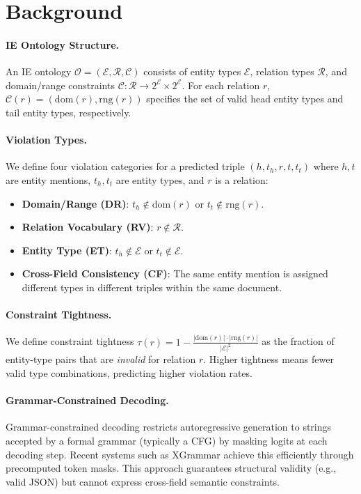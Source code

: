 \documentclass[11pt,a4paper]{article}
\begin{document}
\section{Background}
\label{sec:background}

\paragraph{IE Ontology Structure.}
An IE ontology $\mathcal{O} = (\mathcal{E}, \mathcal{R}, \mathcal{C})$ consists of entity types $\mathcal{E}$, relation types $\mathcal{R}$, and domain/range constraints $\mathcal{C}: \mathcal{R} \to 2^{\mathcal{E}} \times 2^{\mathcal{E}}$. For each relation $r$, $\mathcal{C}(r) = (\text{dom}(r), \text{rng}(r))$ specifies the set of valid head entity types and tail entity types, respectively.

\paragraph{Violation Types.}
We define four violation categories for a predicted triple $(h, t_h, r, t, t_t)$ where $h, t$ are entity mentions, $t_h, t_t$ are entity types, and $r$ is a relation:
\begin{itemize}
    \item \textbf{Domain/Range (DR)}: $t_h \notin \text{dom}(r)$ or $t_t \notin \text{rng}(r)$.
    \item \textbf{Relation Vocabulary (RV)}: $r \notin \mathcal{R}$.
    \item \textbf{Entity Type (ET)}: $t_h \notin \mathcal{E}$ or $t_t \notin \mathcal{E}$.
    \item \textbf{Cross-Field Consistency (CF)}: The same entity mention is assigned different types in different triples within the same document.
\end{itemize}

\paragraph{Constraint Tightness.}
We define constraint tightness $\tau(r) = 1 - \frac{|\text{dom}(r)| \cdot |\text{rng}(r)|}{|\mathcal{E}|^2}$ as the fraction of entity-type pairs that are \emph{invalid} for relation $r$. Higher tightness means fewer valid type combinations, predicting higher violation rates.

\paragraph{Grammar-Constrained Decoding.}
Grammar-constrained decoding restricts autoregressive generation to strings accepted by a formal grammar (typically a CFG) by masking logits at each decoding step. Recent systems such as XGrammar achieve this efficiently through precomputed token masks. This approach guarantees structural validity (e.g., valid JSON) but cannot express cross-field semantic constraints.
\end{document}
